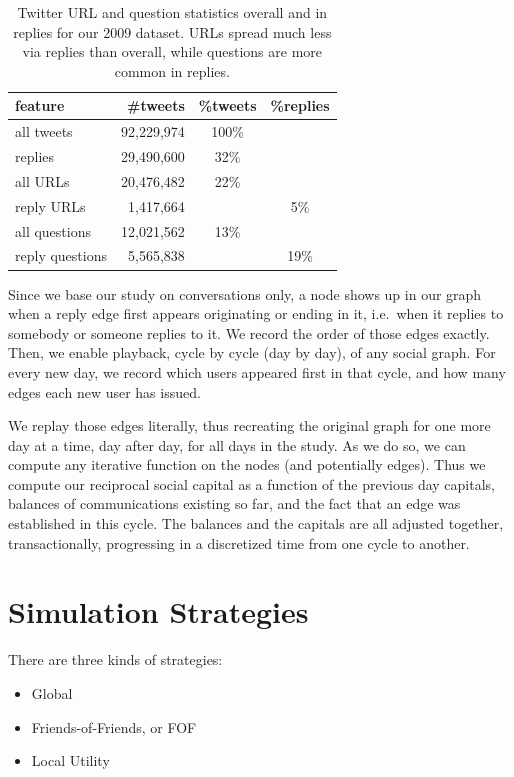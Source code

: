 \documentclass[10pt,oneside]{memoir}
\begin{document}
\begin{table}
\begin{tabular}{|lrcc|}
\toprule
feature & \#tweets & \%tweets & \%replies \\
\midrule
all tweets & 92,229,974 & 100\% & \space\\
replies & 29,490,600 & 32\% & \space \\
all URLs & 20,476,482 &  22\% & \space \\
reply URLs & 1,417,664 & \space & 5\% \\
all questions & 12,021,562 & 13\% & \space \\
reply questions & 5,565,838 & \space & 19\% \\
\bottomrule
\end{tabular}
\label{table:reply-stats}
\caption{Twitter URL and question statistics overall and in replies for our 2009 dataset.  URLs spread much less via replies than overall, while questions are more common in replies.}
\end{table}
Since we base our study on conversations only, a node shows up in our graph when a reply edge first appears originating or ending in it, i.e.\ when it replies to somebody or someone replies to it.  We record the order of those edges exactly.
Then, we enable playback, cycle by cycle (day by day), of any social graph.  For every new day, we record which users appeared first in that cycle, and how many edges each new user has issued.


We replay those edges literally, thus recreating the original graph for one more day at a time, day after day, for all days in the study.  As we do so, we can compute any iterative function on the nodes (and potentially edges).  Thus we compute our reciprocal social capital as a function of the previous day capitals, balances of communications existing so far, and the fact that an edge was established in this cycle.  The balances and the capitals are all adjusted together, transactionally, progressing in a discretized time from one cycle to another.


\pagebreak \section{Simulation Strategies}
\label{simulationstrategies}

There are three kinds of strategies:


\begin{itemize}


\item Global

\item Friends-of-Friends, or FOF

\item Local Utility
\end{itemize}
\end{document}
